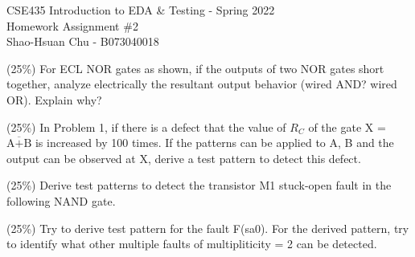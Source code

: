 \documentclass[12pt,answers]{exam}
\begin{document}
\begin{center}
\LARGE CSE435 Introduction to EDA \& Testing - Spring 2022 \\
\Large Homework Assignment \#2 \\
\Large Shao-Hsuan Chu - B073040018 \\
\end{center}
\bigskip

\begin{questions}
  \question (25\%) For ECL NOR gates as shown, if the outputs of two NOR gates short together, analyze electrically the resultant output behavior (wired AND? wired OR). Explain why?
  
  \begin{solution}
  
  \end{solution}

  \question (25\%) In Problem 1, if there is a defect that the value of $R_C$ of the gate X = $\overline{\text{A+B}}$ is increased by 100 times. If the patterns can be applied to A, B and the output can be observed at X, derive a test pattern to detect this defect.
  \begin{solution}
  
  \end{solution}

  \question (25\%) Derive test patterns to detect the transistor M1 stuck-open fault in the following NAND gate.
  
  \begin{solution}
  
  \end{solution}

  \question (25\%) Try to derive test pattern for the fault F(sa0). For the derived pattern, try to identify what other multiple faults of multipliticity = 2 can be detected.
  
  \begin{solution}
  
  \end{solution}
\end{questions}
\end{document}

